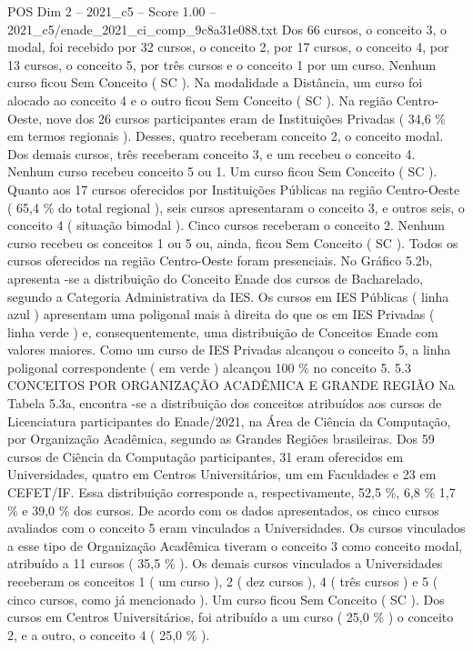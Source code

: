 \begin{textsample}{POS Dim 2 – 2021\_c5 – Score 1.00 – 2021\_c5/enade\_2021\_ci\_comp\_9c8a31e088.txt}
Dos 66 cursos, o conceito 3, o modal, foi recebido por 32 cursos, o conceito 2, por 17 cursos, o conceito 4, por 13 cursos, o conceito 5, por três cursos e o conceito 1 por um curso.
Nenhum curso ficou Sem Conceito ( SC ).
Na modalidade a Distância, um curso foi alocado ao conceito 4 e o outro ficou Sem Conceito ( SC ).
Na região Centro-Oeste, nove dos 26 cursos participantes eram de Instituições Privadas ( 34,6 \% em termos regionais ).
Desses, quatro receberam conceito 2, o conceito modal.
Dos demais cursos, três receberam conceito 3, e um recebeu o conceito 4.
Nenhum curso recebeu conceito 5 ou 1.
Um curso ficou Sem Conceito ( SC ).
Quanto aos 17 cursos oferecidos por Instituições Públicas na região Centro-Oeste ( 65,4 \% do total regional ), seis cursos apresentaram o conceito 3, e outros seis, o conceito 4 ( situação bimodal ).
Cinco cursos receberam o conceito 2.
Nenhum curso recebeu os conceitos 1 ou 5 ou, ainda, ficou Sem Conceito ( SC ).
Todos os cursos oferecidos na região Centro-Oeste foram presenciais.
No Gráfico 5.2b, apresenta -se a distribuição do Conceito Enade dos cursos de Bacharelado, segundo a Categoria Administrativa da IES.
Os cursos em IES Públicas ( linha azul ) apresentam uma poligonal mais à direita do que os em IES Privadas ( linha verde ) e, consequentemente, uma distribuição de Conceitos Enade com valores maiores.
Como um curso de IES Privadas alcançou o conceito 5, a linha poligonal correspondente ( em verde ) alcançou 100 \% no conceito 5. 5.3 CONCEITOS POR ORGANIZAÇÃO ACADÊMICA E GRANDE REGIÃO Na Tabela 5.3a, encontra -se a distribuição dos conceitos atribuídos aos cursos de Licenciatura participantes do Enade/2021, na Área de Ciência da Computação, por Organização Acadêmica, segundo as Grandes Regiões brasileiras.
Dos 59 cursos de Ciência da Computação participantes, 31 eram oferecidos em Universidades, quatro em Centros Universitários, um em Faculdades e 23 em CEFET/IF.
Essa distribuição corresponde a, respectivamente, 52,5 \%, 6,8 \% 1,7 \% e 39,0 \% dos cursos.
De acordo com os dados apresentados, os cinco cursos avaliados com o conceito 5 eram vinculados a Universidades.
Os cursos vinculados a esse tipo de Organização Acadêmica tiveram o conceito 3 como conceito modal, atribuído a 11 cursos ( 35,5 \% ).
Os demais cursos vinculados a Universidades receberam os conceitos 1 ( um curso ), 2 ( dez cursos ), 4 ( três cursos ) e 5 ( cinco cursos, como já mencionado ).
Um curso ficou Sem Conceito ( SC ).
Dos cursos em Centros Universitários, foi atribuído a um curso ( 25,0 \% ) o conceito 2, e a outro, o conceito 4 ( 25,0 \% ).

\end{textsample}
